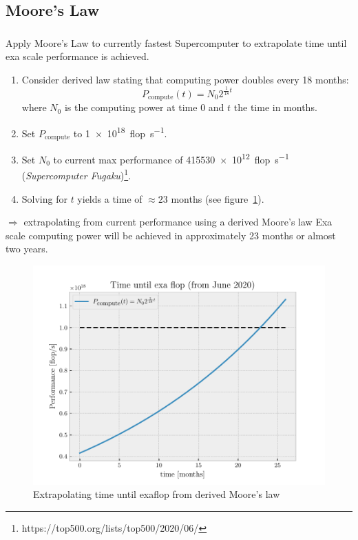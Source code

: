 \documentclass[]{scrartcl}
\begin{document}
\subsection{Moore's Law}
\subsubsection{}
Apply Moore's Law to currently fastest Supercomputer to extrapolate time until exa
scale performance is achieved.
\begin{enumerate}
	\item Consider derived law stating that computing power doubles every 18 months:
	\begin{equation}
		P_{\textrm{compute}}(t) = N_0 2^{\frac{1}{18} t}
	\end{equation}
	where $ N_0 $ is the computing power at time 0 and $ t $ the time in months.
	\item Set $ P_{\textrm{compute}} $ to \SI{1e18}{flop\per\second}.
	\item Set $ N_0 $ to current max performance of \SI{415530e12}{flop\per\second}
	(\emph{Supercomputer Fugaku})\footnote{https://top500.org/lists/top500/2020/06/}.
\item Solving for $ t $ yields a time of $ \approx23 $ months (see figure~\ref{fig:Moore}).
\end{enumerate}
$ \Rightarrow $ extrapolating from current performance using a derived Moore's law
Exa scale computing power will be achieved in approximately 23 months or almost two years.
\begin{figure}[htpb]
	\centering
	\includegraphics[width=0.8\linewidth]{./plots/Moore}
	\caption{Extrapolating time until exaflop from derived Moore's law}%
	\label{fig:Moore}
\end{figure}
\end{document}
